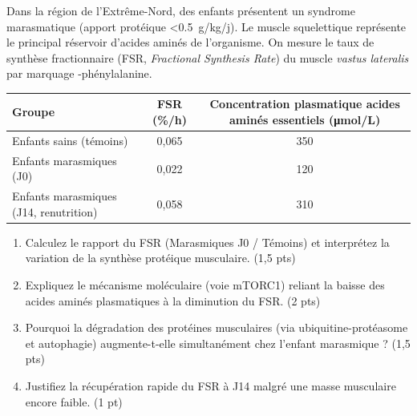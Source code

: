 \documentclass[11pt]{article}
\begin{document}
\begin{exercice}
Dans la région de l'Extrême-Nord, des enfants présentent un syndrome marasmatique (apport protéique \textless \SI{0,5}{g/kg/j}). Le muscle squelettique représente le principal réservoir d'acides aminés de l'organisme. On mesure le taux de synthèse fractionnaire (FSR, \textit{Fractional Synthesis Rate}) du muscle \textit{vastus lateralis} par marquage -phénylalanine.

\begin{center}
\begin{tabular}{|l|c|c|}
\hline
Groupe & FSR (\%/h) & Concentration plasmatique acides aminés essentiels (\si{\micro mol/L}) \\
\hline
Enfants sains (témoins) & 0,065 & 350 \\
\hline
Enfants marasmiques (J0) & 0,022 & 120 \\
\hline
Enfants marasmiques (J14, renutrition) & 0,058 & 310 \\
\hline
\end{tabular}
\end{center}

\begin{enumerate}
    \item Calculez le rapport du FSR (Marasmiques J0 / Témoins) et interprétez la variation de la synthèse protéique musculaire. (1,5 pts)
    \item Expliquez le mécanisme moléculaire (voie mTORC1) reliant la baisse des acides aminés plasmatiques à la diminution du FSR. (2 pts)
    \item Pourquoi la dégradation des protéines musculaires (via ubiquitine-protéasome et autophagie) augmente-t-elle simultanément chez l'enfant marasmique ? (1,5 pts)
    \item Justifiez la récupération rapide du FSR à J14 malgré une masse musculaire encore faible. (1 pt)
\end{enumerate}
\end{exercice}
\end{document}
